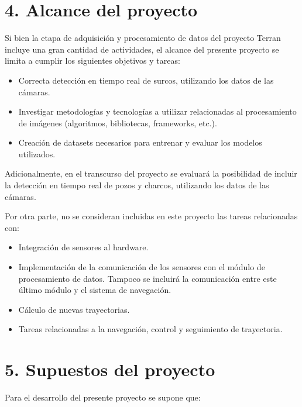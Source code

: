 \documentclass[
11pt, %
codirector, %
]{charter}
\begin{document}
\section{4. Alcance del proyecto}
\label{sec:alcance}

Si bien la etapa de adquisición y procesamiento de datos del proyecto Terran incluye una gran cantidad de actividades, el alcance del presente proyecto se limita a cumplir los siguientes objetivos y tareas:

\begin{itemize}
	\item Correcta detección en tiempo real de surcos, utilizando los datos de las cámaras.
	\item Investigar metodologías y tecnologías a utilizar relacionadas al procesamiento de imágenes (algoritmos, bibliotecas, frameworks, etc.).
	\item Creación de datasets necesarios para entrenar y evaluar los modelos utilizados. 
\end{itemize}

Adicionalmente, en el transcurso del proyecto se evaluará la posibilidad de incluir la detección en tiempo real de pozos y charcos, utilizando los datos de las cámaras.

Por otra parte, no se consideran incluidas en este proyecto las tareas relacionadas con:

\begin{itemize}
	\item Integración de sensores al hardware.	
	\item Implementación de la comunicación de los sensores con el módulo de procesamiento de datos. Tampoco se incluirá la comunicación entre este último módulo y el sistema de navegación.
	\item Cálculo de nuevas trayectorias.
	\item Tareas relacionadas a la navegación, control y seguimiento de trayectoria.
\end{itemize}

\section{5. Supuestos del proyecto}
\label{sec:supuestos}

Para el desarrollo del presente proyecto se supone que:
\end{document}
